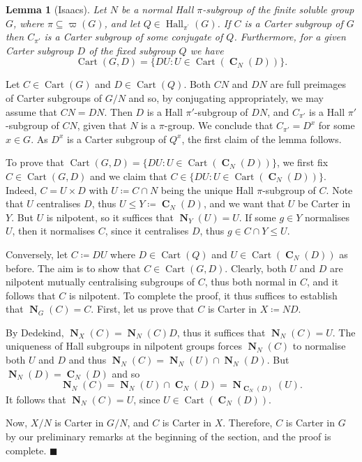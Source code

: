 \documentclass[10pt,a4paper]{amsart}
\numberwithin{equation}{section}
\DeclareMathOperator{\N}{\mathbf{N}}
\DeclareMathOperator{\Hall}{Hall}
\DeclareMathOperator{\cart}{Cart}
\DeclareMathOperator{\cent}{\mathbf{C}}
\renewcommand{\leq}{\leqslant}
\newenvironment{proofof}{{\bf {Proof.} }}{\hfill $\blacksquare$ \\}
\newtheorem{lemma}[theorem]{Lemma}
\begin{document}
\begin{lemma}[Isaacs]\label{Lem:normalhall-Isaacs}
Let $N$ be a normal Hall $\pi$-subgroup of the finite soluble group $G$,
where $\pi \subseteq \varpi(G)$, 
and let $Q \in \Hall_{\pi^{\prime}}(G)$. 
If $C$ is a Carter subgroup of $G$ then $C_{\pi'}$ is a  Carter subgroup of some conjugate of $Q$. 
Furthermore, for a given Carter subgroup $D$ of the fixed subgroup $Q$ 
we have 
\[
\cart(G, D) = \{ DU : U \in \cart(\cent_N(D))\}.
\]

\end{lemma}
\begin{proofof}
Let $C \in \cart (G)$ and $D \in \cart(Q)$.  Both $CN$ and $DN$ are full preimages of Carter subgroups of $G/N$ and so, by conjugating appropriately, we may assume that $CN=DN$. Then $D$ is a Hall  $\pi'$-subgroup of $DN$,  and $C_{\pi'}$ is a Hall  $\pi'$-subgroup of $CN$, given that $N$ is a $\pi$-group. 
We conclude that $C_{\pi'}= D^x$ for some $x \in G$. As  $D^x$ is a Carter subgroup of $Q^x$, 
the first claim of the lemma follows.  

To prove that $\cart(G, D)=   \{ DU : U \in \cart(\cent_N(D))\}$, 
we first fix   $C \in \cart (G, D)$ and we claim that $C \in  \{ DU : U \in \cart(\cent_N(D))\}$. Indeed, $C = U \times D$ with $U \coloneqq C \cap N$ being the unique Hall $\pi$-subgroup of $C$. Note that $U$ centralises $D$, thus $U \leq Y \coloneqq \cent_N(D)$, and we want that $U$ be Carter in $Y$. But $U$ is nilpotent, so it suffices that $\N_Y(U) = U$. If some $g \in Y$ normalises $U$, then it normalises $C$, since it centralises $D$, thus $g \in C \cap Y \leq U$.

Conversely, let $C \coloneqq DU$ where  $D \in \cart(Q)$ and  $U \in \cart(\cent_N(D))$  as before. The aim is to show that $C \in \cart(G, D)$.   Clearly, both $U$ and $D$ are nilpotent mutually centralising subgroups of $C$, thus both normal in $C$, and it follows that $C$ is nilpotent. To complete the proof, it thus suffices to establish that $\N_G(C) = C$. 
First, let us prove that $C$ is Carter in $X \coloneqq ND$. 

By Dedekind, $\N_X(C) = \N_N(C)D$, thus it suffices that $\N_N(C) = U$. 
The uniqueness of Hall subgroups in nilpotent groups 
forces $\N_N(C)$ to normalise both $U$ and $D$ and thus $\N_N(C) = \N_N(U ) \cap \N_N(D)$. 
But  $\N_N(D) = \cent_N(D)$
and so
\[
\N_N(C) =  \N_N(U ) \cap \cent_N(D)= \N_{\cent_N(D)}(U). 
\]
It follows that $\N_N(C)= U$,  since  $U \in \cart(\cent_N(D))$. 

Now, $X/N$ is Carter in $G/N$, and $C$ is Carter in $X$. 
Therefore, $C$ is Carter in $G$ by our preliminary remarks at the beginning of the section, 
and the proof is complete.
\end{proofof}
\end{document}
